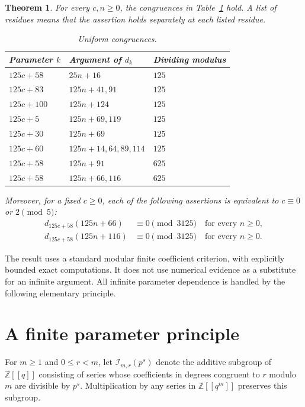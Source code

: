 \documentclass[11pt]{article}
\newtheorem{theorem}{Theorem}
\newcommand{\Z}{\mathbb Z}
\begin{document}
\begin{theorem}\label{thm:main}
For every $c,n\ge0$, the congruences in Table~\ref{tab:results} hold. A list of residues means that the assertion holds separately at each listed residue.
\begin{table}[ht]
\centering
\begin{tabular}{lll}
\toprule
Parameter $k$ & Argument of $d_k$ & Dividing modulus\\
\midrule
$125c+58$ & $25n+16$ & $125$\\
$125c+83$ & $125n+41,91$ & $125$\\
$125c+100$ & $125n+124$ & $125$\\
$125c+5$ & $125n+69,119$ & $125$\\
$125c+30$ & $125n+69$ & $125$\\
$125c+60$ & $125n+14,64,89,114$ & $125$\\
$125c+58$ & $125n+91$ & $625$\\
$125c+58$ & $125n+66,116$ & $625$\\
\bottomrule
\end{tabular}
\caption{Uniform congruences.}\label{tab:results}
\end{table}
Moreover, for a fixed $c\ge0$, each of the following assertions is equivalent to $c\equiv0$ or $2\pmod5$:
\begin{align}
 d_{125c+58}(125n+66)&\equiv0\pmod{3125}\quad\text{for every }n\ge0,\label{eq:66}\\
 d_{125c+58}(125n+116)&\equiv0\pmod{3125}\quad\text{for every }n\ge0.\label{eq:116}
\end{align}
\end{theorem}

The result uses a standard modular finite coefficient criterion, with explicitly bounded exact computations. It does not use numerical evidence as a substitute for an infinite argument. All infinite parameter dependence is handled by the following elementary principle.

\section{A finite parameter principle}
For $m\ge1$ and $0\le r<m$, let $\mathcal I_{m,r}(p^s)$ denote the additive subgroup of $\Z[[q]]$ consisting of series whose coefficients in degrees congruent to $r$ modulo $m$ are divisible by $p^s$. Multiplication by any series in $\Z[[q^m]]$ preserves this subgroup.
\end{document}
